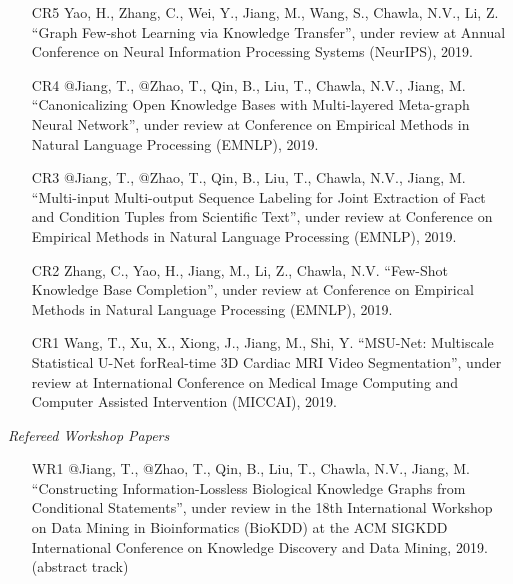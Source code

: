 \documentclass[10pt]{article}
\newenvironment{myindentpar}[1]%
{\begin{list}{}%
         {\setlength{\leftmargin}{#1}}%
         \item[]%
}
{\end{list}}
\newcounter{list}
\begin{document}
\begin{myindentpar}{0.00cm}
\begin{enumerate}[leftmargin=.5cm]
\item[CR5] Yao, H., Zhang, C., Wei, Y., Jiang, M., Wang, S., Chawla, N.V., Li, Z. ``Graph Few-shot Learning via Knowledge Transfer'', under review at Annual Conference on Neural Information Processing Systems (NeurIPS), 2019.

\item[CR4] @Jiang, T., @Zhao, T., Qin, B., Liu, T., Chawla, N.V., Jiang, M. ``Canonicalizing Open Knowledge Bases with Multi-layered Meta-graph Neural Network'', under review at Conference on Empirical Methods in Natural Language Processing (EMNLP), 2019.

\item[CR3] @Jiang, T., @Zhao, T., Qin, B., Liu, T., Chawla, N.V., Jiang, M. ``Multi-input Multi-output Sequence Labeling for Joint Extraction of Fact and Condition Tuples from Scientific Text'', under review at Conference on Empirical Methods in Natural Language Processing (EMNLP), 2019.
	
\item[CR2] Zhang, C., Yao, H., Jiang, M., Li, Z., Chawla, N.V. ``Few-Shot Knowledge Base Completion'', under review at Conference on Empirical Methods in Natural Language Processing (EMNLP), 2019.

\item[CR1] Wang, T., Xu, X., Xiong, J., Jiang, M., Shi, Y. ``MSU-Net: Multiscale Statistical U-Net forReal-time 3D Cardiac MRI Video Segmentation'', under review at International Conference on Medical Image Computing and Computer Assisted Intervention (MICCAI), 2019.

\end{enumerate}

\vspace{.2cm}\hspace{-0.25cm}\emph{Refereed Workshop Papers}

\begin{enumerate}[leftmargin=.5cm]

\item[WR1] @Jiang, T., @Zhao, T., Qin, B., Liu, T., Chawla, N.V., Jiang, M. ``Constructing Information-Lossless Biological Knowledge Graphs from Conditional Statements'', under review in the 18th International Workshop on Data Mining in Bioinformatics (BioKDD) at the ACM SIGKDD International Conference on Knowledge Discovery and Data Mining, 2019. (abstract track)

\end{enumerate}

\end{myindentpar}
\end{document}
